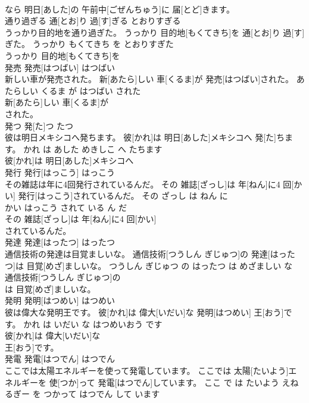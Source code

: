 \documentclass[8pt]{extreport}
\begin{document}
\begin{CJK}{UTF8}{min}
\\	なら 明日[あした]の 午前中[ごぜんちゅう]に 届[とど]きます。			
\\	通り過ぎる	通[とお]り 過[す]ぎる	とおりすぎる	
\\	うっかり目的地を通り過ぎた。	うっかり 目的地[もくてきち]を 通[とお]り 過[す]ぎた。	うっかり もくてきち を とおりすぎた	
\\	うっかり 目的地[もくてきち]を
\\	発売	発売[はつばい]	はつばい	
\\	新しい車が発売された。	新[あたら]しい 車[くるま]が 発売[はつばい]された。	あたらしい くるま が はつばい された	
\\	新[あたら]しい 車[くるま]が
\\	された。			
\\	発つ	発[た]つ	たつ	
\\	彼は明日メキシコへ発ちます。	彼[かれ]は 明日[あした]メキシコへ 発[た]ちます。	かれ は あした めきしこ へ たちます	
\\	彼[かれ]は 明日[あした]メキシコへ
\\	発行	発行[はっこう]	はっこう	
\\	その雑誌は年に4回発行されているんだ。	その 雑誌[ざっし]は 年[ねん]に4 回[かい] 発行[はっこう]されているんだ。	その ざっし は ねん に 
\\	かい はっこう されて いる ん だ	
\\	その 雑誌[ざっし]は 年[ねん]に4 回[かい]
\\	されているんだ。			
\\	発達	発達[はったつ]	はったつ	
\\	通信技術の発達は目覚ましいな。	通信技術[つうしん ぎじゅつ]の 発達[はったつ]は 目覚[めざ]ましいな。	つうしん ぎじゅつ の はったつ は めざましい な	
\\	通信技術[つうしん ぎじゅつ]の
\\	は 目覚[めざ]ましいな。			
\\	発明	発明[はつめい]	はつめい	
\\	彼は偉大な発明王です。	彼[かれ]は 偉大[いだい]な 発明[はつめい] 王[おう]です。	かれ は いだい な はつめいおう です	
\\	彼[かれ]は 偉大[いだい]な
\\	王[おう]です。			
\\	発電	発電[はつでん]	はつでん	
\\	ここでは太陽エネルギーを使って発電しています。	ここでは 太陽[たいよう]エネルギーを 使[つか]って 発電[はつでん]しています。	ここ で は たいよう えねるぎー を つかって はつでん して います	

\end{CJK}
\end{document}
